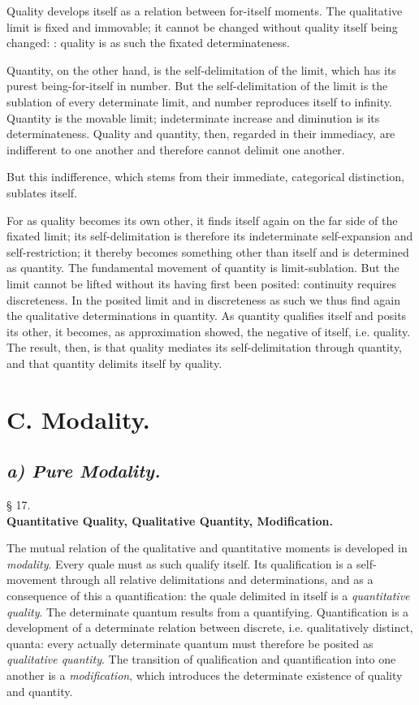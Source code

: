 \documentclass[12pt,a4paper,openany]{book}
\newcommand{\opage}[1]{\marginnote{\footnotesize\textit{[#1]}}}
\newcommand{\afsnit}[1]{\section*{\centering\textbf{#1}}\addcontentsline{toc}{section}{#1}}
\newcommand{\underafsnit}[1]{\subsection*{\centering\emph{#1}}\addcontentsline{toc}{subsection}{#1}}
\newcommand{\paragraf}[2]{\begin{center}§ #1.\\[0.2em]\textbf{#2}\end{center}}
\begin{document}
Quality develops itself as a relation between for-itself moments. The qualitative limit is fixed and immovable; it cannot be changed without
\setcounter{footnote}{0}%
\opage{50}quality itself being changed: : quality is as such the fixated determinateness.

Quantity, on the other hand, is the self-delimitation of the limit, which has its purest being-for-itself in number. But the self-delimitation of the limit is the sublation of every determinate limit, and number reproduces itself to infinity. Quantity is the movable limit; indeterminate increase and diminution is its determinateness. Quality and quantity, then, regarded in their immediacy, are indifferent to one another and therefore cannot delimit one another.

But this indifference, which stems from their immediate, categorical distinction, sublates itself.

For as quality becomes its own other, it finds itself again on the far side of the fixated limit; its self-delimitation is therefore its indeterminate self-expansion and self-restriction; it thereby becomes something other than itself and is determined as quantity. The fundamental movement of quantity is limit-sublation. But the limit cannot be lifted without its having first been posited: continuity requires discreteness. In the posited limit and in discreteness as such we thus find again the qualitative determinations in quantity. As quantity qualifies itself and posits its other, it becomes, as approximation showed, the negative of itself, i.e. quality. The result, then, is that quality mediates its self-delimitation through quantity, and that quantity delimits itself by quality.
\setcounter{footnote}{0}%
\opage{51}\afsnit{C. Modality.}
\underafsnit{a) Pure Modality.}
\paragraf{17}{Quantitative Quality, Qualitative Quantity, Modification.}

The mutual relation of the qualitative and quantitative moments is developed in \emph{modality}. Every quale must as such qualify itself. Its qualification is a self-movement through all relative delimitations and determinations, and as a consequence of this a quantification: the quale delimited in itself is a \emph{quantitative quality}. The determinate quantum results from a quantifying. Quantification is a development of a determinate relation between discrete, i.e. qualitatively distinct, quanta: every actually determinate quantum must therefore be posited as \emph{qualitative quantity}. The transition of qualification and quantification into one another is a \emph{modification}, which introduces the determinate existence of quality and quantity.
\end{document}
